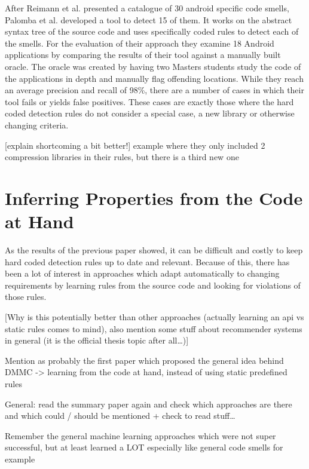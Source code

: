 After Reimann et al. \cite{reimann2014tool} presented a catalogue of 30 android specific code smells, Palomba et al. \cite{palomba2017lightweight} developed a tool to detect 15 of them.
It works on the abstract syntax tree of the source code and uses specifically coded rules to detect each of the smells.
For the evaluation of their approach they examine 18 Android applications by comparing the results of their tool against a manually built oracle.
The oracle was created by having two Masters students study the code of the applications in depth and manually flag offending locations.
While they reach an average precision and recall of 98\%, there are a number of cases in which their tool fails or yields false positives.
These cases are exactly those where the hard coded detection rules do not consider a special case, a new library or otherwise changing criteria.

[explain shortcoming a bit better!]
example where they only included 2 compression libraries in their rules, but there is a third new one

\section{Inferring Properties from the Code at Hand}

As the results of the previous paper showed, it can be difficult and costly to keep hard coded detection rules up to date and relevant.
Because of this, there has been a lot of interest in approaches which adapt automatically to changing requirements by learning rules from the source code and looking for violations of those rules.

[Why is this potentially better than other approaches (actually learning an api vs static rules comes to mind),
also mention some stuff about recommender systems in general (it is the official thesis topic after all\ldots)]

Mention \cite{engler2001bugs} as probably the first paper which proposed the general idea behind DMMC -> learning from the code at hand, instead of using static predefined rules

General: read the summary paper \cite{robillard2013automated} again and check which approaches are there and which could / should be mentioned
+ check to read stuff\ldots

Remember the general machine learning approaches which were not super successful, but at least learned a LOT
especially like general code smells for example

